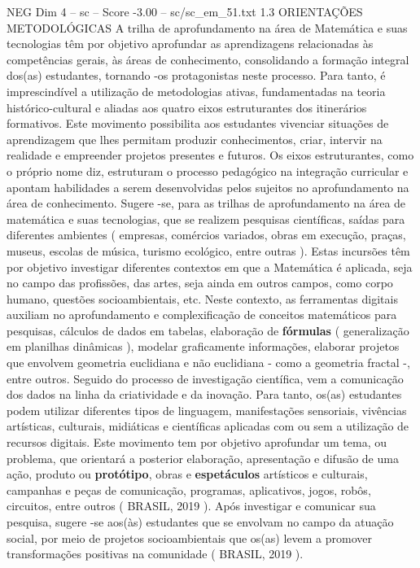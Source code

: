 \begin{textsample}{NEG Dim 4 – sc – Score -3.00 – sc/sc\_em\_51.txt}  \label{ex:f4_neg_255}
1.3 ORIENTAÇÕES METODOLÓGICAS A trilha de aprofundamento na área de Matemática e suas tecnologias têm por objetivo aprofundar as aprendizagens relacionadas às competências gerais, às áreas de conhecimento, consolidando a formação integral dos(as) estudantes, tornando -os protagonistas neste processo.
Para tanto, é imprescindível a utilização de metodologias ativas, fundamentadas na teoria histórico-cultural e aliadas aos quatro eixos estruturantes dos itinerários formativos.
Este movimento possibilita aos estudantes vivenciar situações de aprendizagem que lhes permitam produzir conhecimentos, criar, intervir na realidade e empreender projetos presentes e futuros.
Os eixos estruturantes, como o próprio nome diz, estruturam o processo pedagógico na integração curricular e apontam habilidades a serem desenvolvidas pelos sujeitos no aprofundamento na área de conhecimento.
Sugere -se, para as trilhas de aprofundamento na área de matemática e suas tecnologias, que se realizem pesquisas científicas, saídas para diferentes ambientes ( empresas, comércios variados, obras em execução, praças, museus, escolas de música, turismo ecológico, entre outras ).
Estas incursões têm por objetivo investigar diferentes contextos em que a Matemática é aplicada, seja no campo das profissões, das artes, seja ainda em outros campos, como corpo humano, questões socioambientais, etc.
Neste contexto, as ferramentas digitais auxiliam no aprofundamento e complexificação de conceitos matemáticos para pesquisas, cálculos de dados em tabelas, elaboração de \textbf{fórmulas} ( generalização em planilhas dinâmicas ), modelar graficamente informações, elaborar projetos que envolvem geometria euclidiana e não euclidiana - como a geometria fractal -, entre outros.
Seguido do processo de investigação científica, vem a comunicação dos dados na linha da criatividade e da inovação.
Para tanto, os(as) estudantes podem utilizar diferentes tipos de linguagem, manifestações sensoriais, vivências artísticas, culturais, midiáticas e científicas aplicadas com ou sem a utilização de recursos digitais.
Este movimento tem por objetivo aprofundar um tema, ou problema, que orientará a posterior elaboração, apresentação e difusão de uma ação, produto ou \textbf{protótipo}, obras e \textbf{espetáculos} artísticos e culturais, campanhas e peças de comunicação, programas, aplicativos, jogos, robôs, circuitos, entre outros ( BRASIL, 2019 ).
Após investigar e comunicar sua pesquisa, sugere -se aos(às) estudantes que se envolvam no campo da atuação social, por meio de projetos socioambientais que os(as) levem a promover transformações positivas na comunidade ( BRASIL, 2019 ).

\end{textsample}
